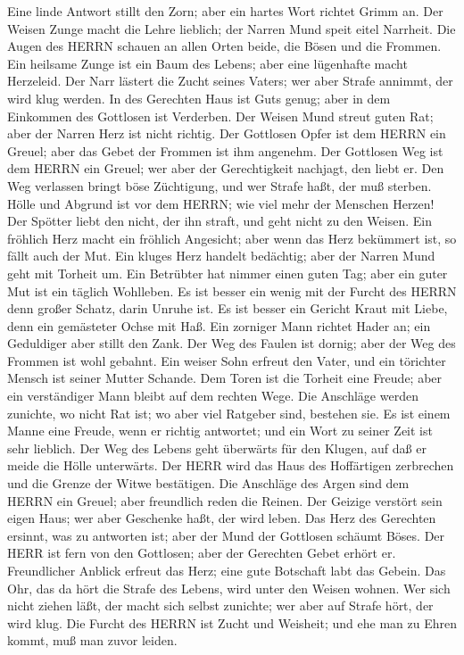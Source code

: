  Eine linde Antwort stillt den Zorn; aber ein hartes Wort
richtet Grimm an.  Der Weisen Zunge macht die Lehre
lieblich; der Narren Mund speit eitel Narrheit.  Die Augen
des HERRN schauen an allen Orten beide, die Bösen und die Frommen.
 Ein heilsame Zunge ist ein Baum des Lebens; aber eine
lügenhafte macht Herzeleid.  Der Narr lästert die Zucht
seines Vaters; wer aber Strafe annimmt, der wird klug werden.
 In des Gerechten Haus ist Guts genug; aber in dem Einkommen
des Gottlosen ist Verderben.  Der Weisen Mund streut guten
Rat; aber der Narren Herz ist nicht richtig.  Der Gottlosen
Opfer ist dem HERRN ein Greuel; aber das Gebet der Frommen ist ihm
angenehm.  Der Gottlosen Weg ist dem HERRN ein Greuel; wer
aber der Gerechtigkeit nachjagt, den liebt er.  Den Weg
verlassen bringt böse Züchtigung, und wer Strafe haßt, der muß sterben.
 Hölle und Abgrund ist vor dem HERRN; wie viel mehr der
Menschen Herzen!  Der Spötter liebt den nicht, der ihn
straft, und geht nicht zu den Weisen.  Ein fröhlich Herz
macht ein fröhlich Angesicht; aber wenn das Herz bekümmert ist, so fällt
auch der Mut.  Ein kluges Herz handelt bedächtig; aber der
Narren Mund geht mit Torheit um.  Ein Betrübter hat nimmer
einen guten Tag; aber ein guter Mut ist ein täglich Wohlleben.
 Es ist besser ein wenig mit der Furcht des HERRN denn
großer Schatz, darin Unruhe ist.  Es ist besser ein Gericht
Kraut mit Liebe, denn ein gemästeter Ochse mit Haß.  Ein
zorniger Mann richtet Hader an; ein Geduldiger aber stillt den Zank.
 Der Weg des Faulen ist dornig; aber der Weg des Frommen
ist wohl gebahnt.  Ein weiser Sohn erfreut den Vater, und
ein törichter Mensch ist seiner Mutter Schande.  Dem Toren
ist die Torheit eine Freude; aber ein verständiger Mann bleibt auf dem
rechten Wege.  Die Anschläge werden zunichte, wo nicht Rat
ist; wo aber viel Ratgeber sind, bestehen sie.  Es ist
einem Manne eine Freude, wenn er richtig antwortet; und ein Wort zu
seiner Zeit ist sehr lieblich.  Der Weg des Lebens geht
überwärts für den Klugen, auf daß er meide die Hölle unterwärts.
 Der HERR wird das Haus des Hoffärtigen zerbrechen und die
Grenze der Witwe bestätigen.  Die Anschläge des Argen sind
dem HERRN ein Greuel; aber freundlich reden die Reinen. 
Der Geizige verstört sein eigen Haus; wer aber Geschenke haßt, der wird
leben.  Das Herz des Gerechten ersinnt, was zu antworten
ist; aber der Mund der Gottlosen schäumt Böses.  Der HERR
ist fern von den Gottlosen; aber der Gerechten Gebet erhört er.
 Freundlicher Anblick erfreut das Herz; eine gute Botschaft
labt das Gebein.  Das Ohr, das da hört die Strafe des
Lebens, wird unter den Weisen wohnen.  Wer sich nicht
ziehen läßt, der macht sich selbst zunichte; wer aber auf Strafe hört,
der wird klug.  Die Furcht des HERRN ist Zucht und
Weisheit; und ehe man zu Ehren kommt, muß man zuvor leiden.

